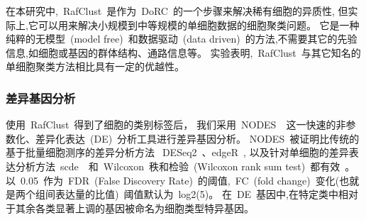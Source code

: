 在本研究中,~RafClust~是作为~DoRC~的一个步骤来解决稀有细胞的异质性,
但实际上,它可以用来解决小规模到中等规模的单细胞数据的细胞聚类问题。
它是一种纯粹的无模型~(model free)~和数据驱动~(data driven)~的方法,不需要其它的先验信息,如细胞或基因的群体结构、通路信息等。
实验表明,~RafClust~与其它知名的单细胞聚类方法相比具有一定的优越性。

\subsubsection{差异基因分析}
\label{subsec:de}

使用~RafClust~得到了细胞的类别标签后，
我们采用~NODES~\cite{Sengupta049734}~这一快速的非参数化、差异化表达~(DE)~分析工具进行差异基因分析。
NODES~被证明比传统的基于批量细胞测序的差异分析方法~DESeq2~\cite{love2014moderated}、edgeR~\cite{robinson2010edger},
以及针对单细胞的差异表达分析方法~scde~\cite{kharchenko2014bayesian}~和~Wilcoxon~秩和检验~(Wilcoxon rank sum test)~都有效~\cite{Sengupta049734}。
以~0.05~作为~FDR~(False Discovery Rate)~的阈值,~FC~(fold change)~变化(也就是两个组间表达量的比值)~阈值默认为~log2(5)。
在~DE~基因中,在特定类中相对于其余各类显著上调的基因被命名为细胞类型特异基因。

